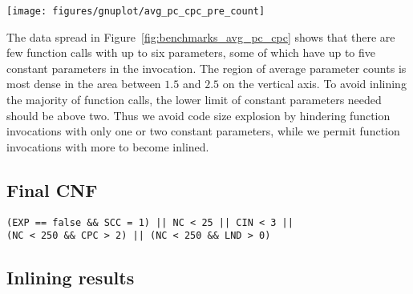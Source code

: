 \begin{centering}
	\noindent\begin{minipage}{\textwidth}
		\captionsetup{type=figure}
		\hspace{-1em}
		\texttt{[image: figures/gnuplot/avg\_pc\_cpc\_pre\_count]}
	\end{minipage}


	\label{fig:benchmarks_avg_pc_cpc}
\end{centering}

The data spread in Figure~\ref{fig:benchmarks_avg_pc_cpc} shows that there are
few function calls with up to six parameters, some of which have up to five
constant parameters in the invocation. The region of average parameter counts is
most dense in the area between $1.5$ and $2.5$ on the vertical axis. To avoid
inlining the majority of function calls, the lower limit of constant parameters
needed should be above two. Thus we avoid code size explosion by hindering
function invocations with only one or two constant parameters, while we permit
function invocations with more to become inlined.


\subsection{Final CNF}
\label{sub:res:final_cnf}

\begin{centering}
\lstinline!(EXP == false && SCC = 1) || NC < 25 || CIN < 3 ||! \\
\lstinline!(NC < 250 && CPC > 2) || (NC < 250 && LND > 0)! \\
\end{centering}

\subsection{Inlining results}
\label{sub:res:inlining}


